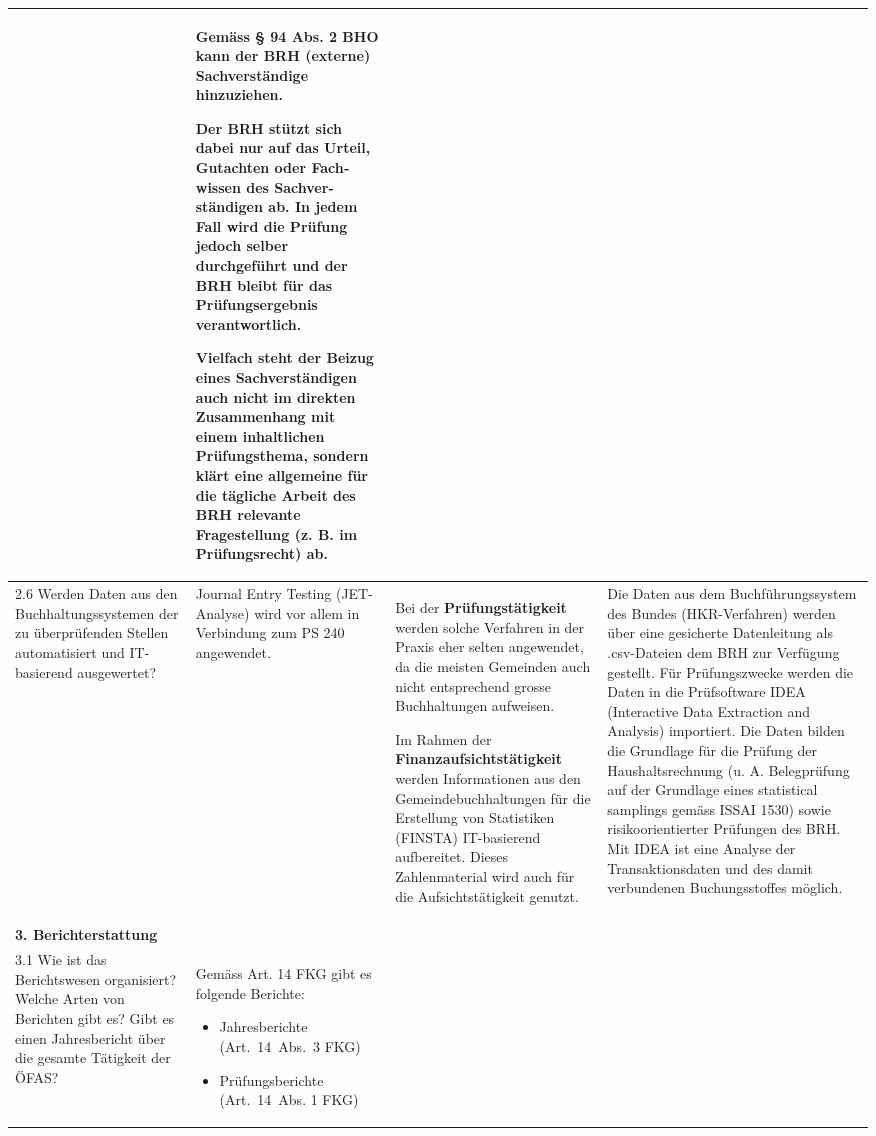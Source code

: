 \documentclass[10pt]{article}
\begin{document}
\begin{landscape}
\begin{center}
\begin{longtable}{|p{4cm}|p{5cm}|p{7.5cm}|p{7.5cm}|}
 & Gemäss § 94 Abs. 2 BHO kann der BRH (externe) Sachver­ständige hinzuziehen.

Der BRH stützt sich dabei nur auf das Urteil, Gutachten oder Fach­wissen des Sachver­ständigen ab. In jedem Fall wird die Prüfung jedoch selber durchgeführt und der BRH bleibt für das Prüfungs­ergebnis verantwortlich.

Vielfach steht der Beizug eines Sachverständigen auch nicht im direkten Zusammenhang mit einem inhaltlichen Prüfungsthema, sondern klärt eine allgemeine für die tägliche Arbeit des BRH relevante Fragestellung (z. B. im Prüfungsrecht) ab.

 \\
\hline
2.6 Werden Daten aus den Buchhaltungssystemen der zu überprüfenden Stellen automatisiert und IT-basierend ausgewertet? & Journal Entry Testing (JET-Analyse) wird vor allem in Verbindung zum PS 240 angewendet.

 & Bei der \textbf{Prüfungstätigkeit }werden solche Verfahren in der Praxis eher selten angewendet, da die meisten Gemeinden auch nicht entsprechend grosse Buchhaltungen aufweisen.

Im Rahmen der \textbf{Finanzaufsicht­stätigkeit} werden Informationen aus den Gemeindebuchhaltungen für die Erstellung von Statistiken (FINSTA) IT-basierend aufbereitet. Dieses Zahlenmaterial wird auch für die Aufsichtstätigkeit genutzt.

 & Die Daten aus dem Buchführungssystem des Bundes (HKR-Verfahren) werden über eine gesicherte Datenleitung als .csv-Dateien dem BRH zur Verfügung gestellt. Für Prüfungszwecke werden die Daten in die Prüfsoftware IDEA (Interactive Data Extraction and Analysis) importiert. Die Daten bilden die Grundlage für die Prüfung der Haushaltsrechnung (u. A.  Belegprüfung auf der Grundlage eines statistical samplings gemäss ISSAI 1530) sowie risikoorientierter Prüfungen des BRH. Mit IDEA ist eine Analyse der Transaktions­daten und des damit verbundenen Buchungsstoffes möglich. \\
\hline
\textbf{3. Berichterstattung} &  &  &  \\
\hline
3.1 Wie ist das Berichtswesen organisiert? Welche Arten von Berichten gibt es? Gibt es einen Jahresbericht über die gesamte Tätigkeit der ÖFAS? & Gemäss Art. 14 FKG gibt es folgende Berichte:

\begin{itemize}
    \item Jahresberichte (Art.~14~Abs.~3 FKG)

    \item Prüfungsberichte (Art.~14~Abs. 1 FKG)


\end{itemize}
\end{longtable}
\end{center}
\end{landscape}
\end{document}
